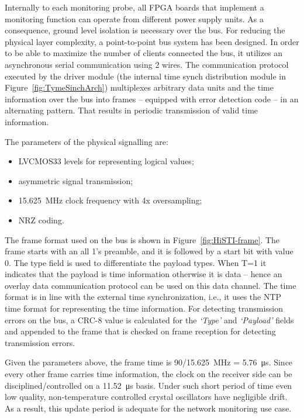 \documentclass[journal]{IEEEtran}
\begin{document}
Internally to each monitoring probe, all FPGA boards that implement a monitoring function can operate from different power supply units. As a
consequence, ground level
isolation is necessary over the bus. For reducing the physical layer complexity,
a point-to-point bus system has been designed. In order to be able to maximize the number of clients connected the
bus, it utilizes an asynchronous serial communication using 2 wires. The communication protocol executed by the driver
module (the internal time synch distribution module in Figure~\ref{fig:TymeSinchArch})
multiplexes arbitrary data units and the time information over the bus into frames -- equipped with error detection
code --
in an alternating pattern. That results in periodic transmission of valid time information.

The parameters of the physical signalling are:
\begin{itemize}
    \item LVCMOS33 levels for representing logical values;
    \item asymmetric signal transmission;
    \item \SI{15.625}{\mega\hertz} clock frequency with 4x oversampling;
    \item NRZ coding.
\end{itemize}

The frame format used on the bus is shown in Figure~\ref{fig:HiSTI-frame}. The frame starts with an all 1's preamble, and it is
followed by a start bit with value 0. The type field is used to differentiate the payload types. When T=1 it
indicates that the payload is
time information otherwise it is data -- hence an overlay data communication protocol can be used on this data channel.
The time format is in line with the external time synchronization, i.e., it uses the NTP
time format for representing the time information. For detecting transmission errors on the bus, a CRC-8 value is
calculated
for the \emph{`Type'} and \emph{`Payload'} fields and appended to the frame that is checked on frame reception for
detecting
transmission errors.

Given the parameters above, the frame time is 90/\SI{15.625}{\mega\hertz} = \SI{5.76}{\micro\second}. Since every
other frame carries time information, the clock on the receiver side can be disciplined/controlled on a
\SI{11.52}{\micro\second}
basis. Under such short period of time even low quality, non-temperature controlled crystal oscillators have negligible
drift.
As a result, this update period is adequate for the network monitoring use case.
\end{document}
